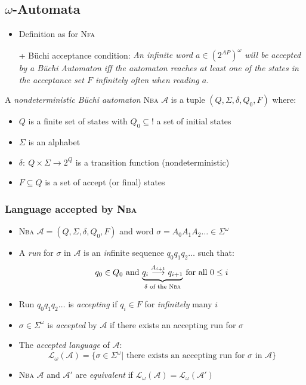 \documentclass[a4paper, 10pt]{article}
\begin{document}
\subsection*{$\omega$-Automata}
\begin{itemize}
    \item Definition as for \textsc{Nfa}
    \item[+] Büchi acceptance condition: \emph{An infinite word $a\in(2^{AP})^\omega$ will be accepted by a Büchi Automaton iff the automaton reaches at least one of the states in the acceptance set $F$ infinitely often when reading $a$.}
\end{itemize}
\begin{shaded}
    A \emph{nondeterministic Büchi automaton} \textsc{Nba} $\mathcal{A}$ is a tuple $(Q,\Sigma,\delta,Q_0,F)$ where:
    \begin{itemize}
        \item $Q$ is a finite set of states with $Q_0\subseteq !$ a set of initial states
        \item $\Sigma$ is an alphabet
        \item $\delta:\ Q\times\Sigma\to2^Q$ is a transition function {\tiny (nondeterministic)}
        \item $F\subseteq Q$ is a set of accept (or final) states
    \end{itemize}
\end{shaded}
\subsubsection*{Language accepted by \textsc{Nba}}
\begin{itemize}
    \item \textsc{Nba} $\mathcal{A}=(Q,\Sigma,\delta,Q_0,F)$ and word $\sigma=A_0A_1A_2\dots\in\Sigma^\omega$
    \item A \emph{run} for $\sigma$ in $\mathcal{A}$ is an \emph{in}finite sequence $q_0q_1q_2\dots$ such that:
    \[ q_0\in Q_0 \textrm{ and }  \underset{\delta \textrm{ of the \textsc{Nba}}}{\underbrace{q_i \overset{A_{i+1}}{\longrightarrow} q_{i+1}}} \textrm{ for all } 0\leq i \]
    \item Run $q_0q_1q_2\dots$ is \emph{accepting} if $q_i\in F$ for \emph{infinitely} many $i$
    \item $\sigma\in\Sigma^\omega$ is \emph{accepted} by $\mathcal{A}$ if there exists an accepting run for $\sigma$
    \item The \emph{accepted language} of $\mathcal{A}$:
    \[ \mathcal{L}_\omega(\mathcal{A})=\{ \sigma\in\Sigma^\omega | \textrm{ there exists an accepting run for } \sigma \textrm{ in } \mathcal{A}\} \]
    \item \textsc{Nba} $\mathcal{A}$ and $\mathcal{A}'$ are \emph{equivalent} if $\mathcal{L}_\omega(\mathcal{A})=\mathcal{L}_\omega(\mathcal{A}') $
\end{itemize}
\end{document}
